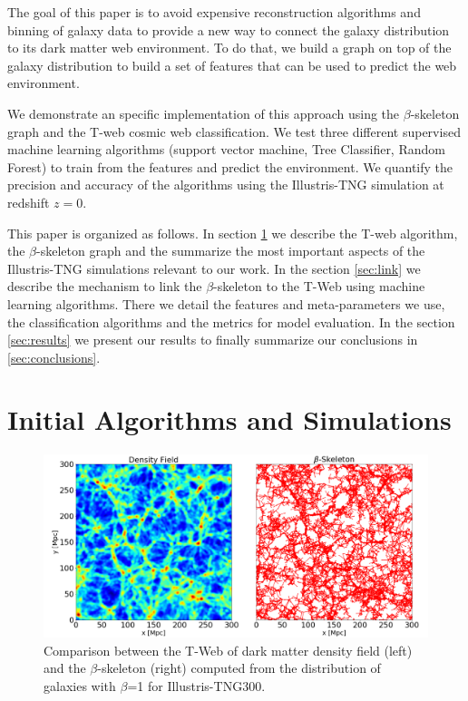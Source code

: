 \documentclass[usenatbib]{mnras}
\begin{document}
The goal of this paper is to avoid expensive reconstruction algorithms
and binning of galaxy data to provide a new way to connect the galaxy
distribution to its dark matter web environment.
To do that, we build a graph on top of the galaxy distribution 
to build a set of features that can be used to predict the web
environment.

We demonstrate an specific implementation of this approach using 
the $\beta$-skeleton graph \citep{Fang2019} and the 
T-web \citep{Forero-Romero2009} cosmic web classification.
We test three different supervised machine learning
algorithms (support vector machine, Tree Classifier, Random Forest) 
to train from the features and predict the environment.
We quantify the precision and accuracy of the algorithms using 
the Illustris-TNG simulation \citep{Nelson2015} at redshift $z=0$.

This paper is organized as follows. 
In section \ref{sec:init} we describe the T-web algorithm,
the $\beta$-skeleton graph and the summarize the most important
aspects of the Illustris-TNG simulations relevant to our work.
In the section \ref{sec:link} we
describe the mechanism to link the $\beta$-skeleton to the T-Web
using machine learning algorithms. 
There we detail the features and meta-parameters we use, the
classification algorithms and the metrics for model evaluation. 
In the section \ref{sec:results} we present our results
to finally summarize our conclusions in \ref{sec:conclusions}.


\section{Initial Algorithms and Simulations}\label{sec:init}

\begin{figure}
\centering
 \includegraphics[scale=0.33]{Figs/Fig1_.png}%
 \caption{Comparison between the T-Web of dark matter density field (left) and the $\beta$-skeleton (right) computed from the distribution of galaxies with $\beta$=1 for Illustris-TNG300.}
 \label{fig:TWebBsk}
\end{figure}
\end{document}
